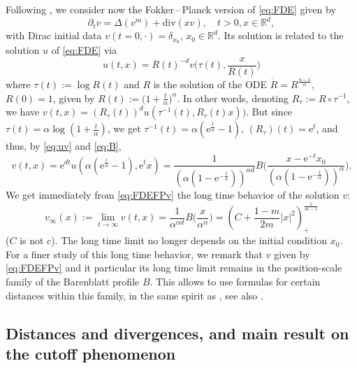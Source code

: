 \documentclass[10pt,reqno]{amsart}
\numberwithin{equation}{section}
\begin{document}
Following \cite[eq.~(18)]{MR1940370}, we consider now the Fokker\,--\,Planck version of \eqref{eq:FDE} given by
\begin{equation}\label{eq:FDEFP}
    \partial_tv=\Delta(v^m)+\mathrm{div}(xv),\quad t>0, x\in\mathbb{R}^d,
\end{equation}
with Dirac initial data $v(t=0,\cdot)=\delta_{x_0}$, $x_0\in\mathbb{R}^d$. Its solution is related to the solution $u$ of \eqref{eq:FDE} via
\begin{equation}\label{eq:uv}
    u(t,x)=R(t)^{-d}v\Bigr(\tau(t),\frac{x}{R(t)}\Bigr)
\end{equation}
where $\tau(t):=\log R(t)$ and $R$ is the solution of the ODE $\dot{R}=R^{\frac{\alpha-1}{\alpha}}$, $R(0)=1$, given by
$R(t):=\big(1+\frac{t}{\alpha}\bigr)^\alpha$. In other words, denoting $R_\tau:=R\circ\tau^{-1}$, we have $v(t,x)=(R_\tau(t))^du(\tau^{-1}(t),R_\tau(t)x))$. But since $\tau(t)=\alpha\log(1+\frac{t}{\alpha})$, we get $\tau^{-1}(t)=\alpha(\mathrm{e}^{\frac{t}{\alpha}}-1)$, 
$(R_\tau)(t)=\mathrm{e}^t$, and thus, by \eqref{eq:uv} and  \eqref{eq:B},
\begin{equation}\label{eq:FDEFPv}
v(t,x)=\mathrm{e}^{dt}u(\alpha(\mathrm{e}^{\frac{t}{\alpha}}-1),\mathrm{e}^tx)
  =\frac{1}{(\alpha(1-\mathrm{e}^{-\frac{t}{\alpha}}))^{\alpha d}}
  B\Bigr(\frac{x-\mathrm{e}^{-t}x_0}{(\alpha(1-\mathrm{e}^{-\frac{t}{\alpha}}))^\alpha}\Bigr).
\end{equation}
We get immediately from \eqref{eq:FDEFPv} the long time behavior of the solution $v$: 
\begin{equation}\label{eq:vinf}
     v_\infty(x):=\lim_{t\to\infty}v(t,x)
    =\frac{1}{\alpha^{\alpha d}}B\Big(\frac{x}{\alpha^\alpha}\Bigr)=\left(C+\frac{1-m}{2m}|x|^2\right)_{+}^\frac{1}{m-1}
\end{equation}
($C$ is not $c$). The long time limit no longer depends on the initial condition $x_0$. For a
finer study of this long time behavior, we remark that $v$ given by
\eqref{eq:FDEFPv} and it particular its long time limit remains in the
position-scale family of the Barenblatt profile $B$. This allows to use
formulas for certain distances within this family, in the same spirit as
\cite[Lemma A.5]{MR4528974}, see also \cite[Lemma 3 and 4]{MR2246356}.

\subsection{Distances and divergences, and main result on the cutoff phenomenon}
\end{document}
